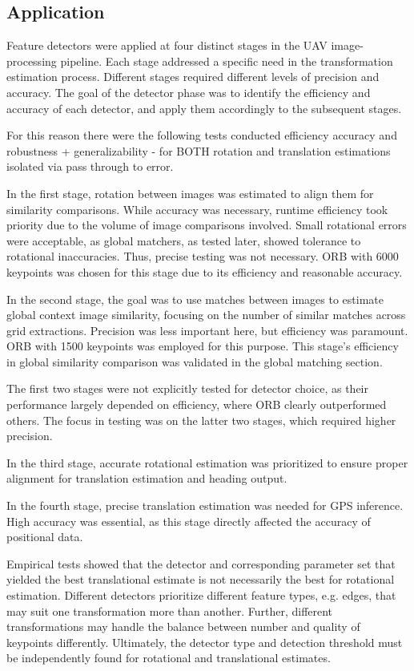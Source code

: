 \subsection*{Application}

Feature detectors were applied at four distinct stages in the UAV image-processing pipeline. Each stage addressed a specific need in the transformation estimation process. Different stages required different levels of precision and accuracy. The goal of the detector phase was to identify the efficiency and accuracy of each detector, and apply them accordingly to the subsequent stages.

For this reason there were the following tests conducted
efficiency
accuracy and robustness + generalizability - for BOTH rotation and translation estimations isolated via pass through to error. 




In the first stage, rotation between images was estimated to align them for similarity comparisons. While accuracy was necessary, runtime efficiency took priority due to the volume of image comparisons involved. Small rotational errors were acceptable, as global matchers, as tested later, showed tolerance to rotational inaccuracies. Thus, precise testing was not necessary. ORB with 6000 keypoints was chosen for this stage due to its efficiency and reasonable accuracy.

In the second stage, the goal was to use matches between images to estimate global context image similarity, focusing on the number of similar matches across grid extractions. Precision was less important here, but efficiency was paramount. ORB with 1500 keypoints was employed for this purpose. This stage’s efficiency in global similarity comparison was validated in the global matching section.

The first two stages were not explicitly tested for detector choice, as their performance largely depended on efficiency, where ORB clearly outperformed others. The focus in testing was on the latter two stages, which required higher precision.

In the third stage, accurate rotational estimation was prioritized to ensure proper alignment for translation estimation and heading output. 

In the fourth stage, precise translation estimation was needed for GPS inference. High accuracy was essential, as this stage directly affected the accuracy of positional data.

Empirical tests showed that the detector and corresponding parameter set that yielded the best translational estimate is not necessarily the best for rotational estimation. Different detectors prioritize different feature types, e.g. edges, that may suit one transformation more than another. Further, different transformations may handle the balance between number and quality of keypoints differently. Ultimately, the detector type and detection threshold must be independently found for rotational and translational estimates. 

